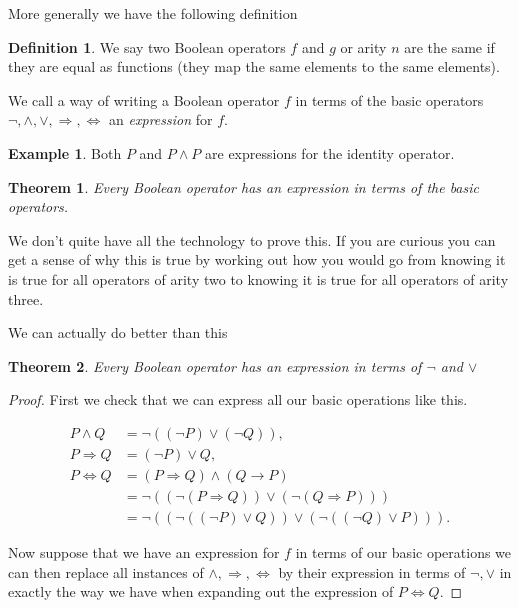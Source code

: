 \documentclass[
]{book}
\newtheorem{theorem}{Theorem}[chapter]
\theoremstyle{definition}
\newtheorem{definition}{Definition}[chapter]
\theoremstyle{definition}
\newtheorem{example}{Example}[chapter]
\theoremstyle{definition}
\theoremstyle{definition}
\theoremstyle{remark}
\begin{document}
More generally we have the following definition

\begin{definition}
We say two Boolean operators \(f\) and \(g\) or arity \(n\) are the same if they are equal as functions (they map the same elements to the same elements).

We call a way of writing a Boolean operator \(f\) in terms of the basic operators \(\neg, \wedge, \vee, \Rightarrow, \Leftrightarrow\) an \emph{expression} for \(f\).
\end{definition}

\begin{example}
Both \(P\) and \(P \wedge P\) are expressions for the identity operator.
\end{example}

\begin{theorem}
Every Boolean operator has an expression in terms of the basic operators.
\end{theorem}

We don't quite have all the technology to prove this. If you are curious you can get a sense of why this is true by working out how you would go from knowing it is true for all operators of arity two to knowing it is true for all operators of arity three.

We can actually do better than this

\begin{theorem}
Every Boolean operator has an expression in terms of \(\neg\) and \(\vee\)
\end{theorem}

\begin{proof}
First we check that we can express all our basic operations like this.

\begin{align*}
P \wedge Q &= \neg ( (\neg P) \vee (\neg Q)),\\
P \Rightarrow Q &= (\neg P) \vee Q, \\
P \Leftrightarrow Q &= (P \Rightarrow Q) \wedge (Q \rightarrow P)\\
&= \neg ( (\neg(P \Rightarrow Q)) \vee (\neg(Q \Rightarrow P))) \\
& = \neg ((\neg((\neg P) \vee Q)) \vee (\neg ((\neg Q) \vee P))).
\end{align*}

Now suppose that we have an expression for \(f\) in terms of our basic operations we can then replace all instances of \(\wedge, \Rightarrow, \Leftrightarrow\) by their expression in terms of \(\neg, \vee\) in exactly the way we have when expanding out the expression of \(P \Leftrightarrow Q\).
\end{proof}
\end{document}
